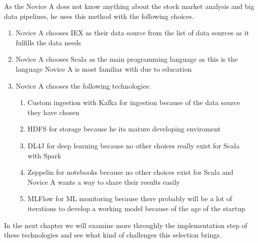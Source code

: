 As the Novice A does not know anything about the stock market analysis and big data pipelines, he uses this method with the following choices.
\begin{enumerate}
    \item Novice A chooses IEX as their data source from the list of data sources as it fulfills the data needs
    \item Novice A chooses Scala as the main programming language as this is the language Novice A is most familiar with due to education
    \item Novice A chooses the following technologies:
    \begin{enumerate}
        \item Custom ingestion with Kafka for ingestion because of the data source they have chosen
        \item HDFS for storage because he its mature developing enviroment
        \item DL4J for deep learning because no other choices really exist for Scala with Spark
        \item Zeppelin for notebooks because no other choices exist for Scala and Novice A wants a way to share their results easily
        \item MLFlow for ML monitoring because there probably will be a lot of iterations to develop a working model because of the age of the startup
    \end{enumerate}
\end{enumerate}

In the next chapter we will examine more throughly the implementation step of these technologies and see what kind of challenges this selection brings.



